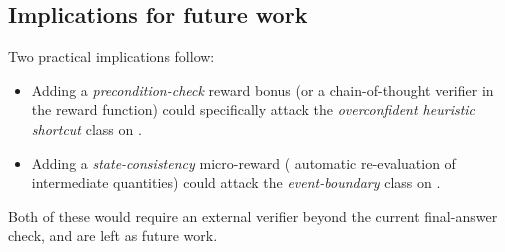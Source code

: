 \subsection{Implications for future work}
Two practical implications follow:

\begin{itemize}
  \item Adding a \emph{precondition-check} reward bonus (or a chain-of-thought
    verifier in the reward function) could specifically attack the
    \emph{overconfident heuristic shortcut} class on .
  \item Adding a \emph{state-consistency} micro-reward (\eg
    automatic re-evaluation of intermediate quantities) could attack the
    \emph{event-boundary} class on .
\end{itemize}

Both of these would require an external verifier beyond the current
final-answer check, and are left as future work.
